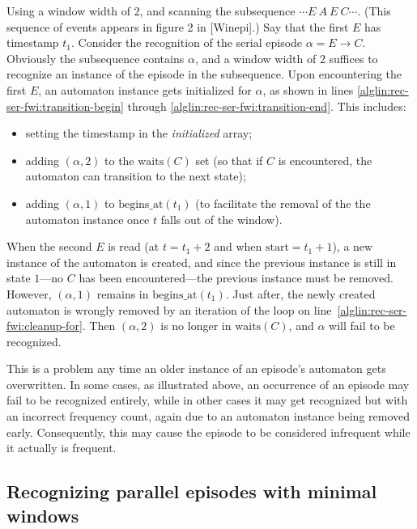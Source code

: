 Using a window width of 2, and scanning the subsequence $ \cdots E \: A \: E \: C \cdots $. (This sequence of events appears in figure 2 in [Winepi].) Say that the first $ E $ has timestamp $ t_1 $. Consider the recognition of the serial episode $ \alpha = E \to C $. Obviously the subsequence contains $ \alpha $, and a window width of 2 suffices to recognize an instance of the episode in the subsequence. Upon encountering the first $ E $, an automaton instance gets initialized for $ \alpha $, as shown in lines \ref{alglin:rec-ser-fwi:transition-begin} through \ref{alglin:rec-ser-fwi:transition-end}. This includes:
\begin{itemize}
\item setting the timestamp in the \emph{initialized} array;
\item adding $ (\alpha, 2) $ to the $ \text{waits}(C) $ set (so that if $ C $ is encountered, the automaton can transition to the next state);
\item adding $ (\alpha, 1) $ to $ \text{begins\_at}(t_1) $ (to facilitate the removal of the the automaton instance once $ t $ falls out of the window).
\end{itemize}

When the second $ E $ is read (at $ t = t_1 + 2 $ and when $ \text{start} = t_1 + 1 $), a new instance of the automaton is created, and since the previous instance is still in state $ 1 $---no $ C $ has been encountered---the previous instance must be removed. However, $ (\alpha, 1) $ remains in $ \text{begins\_at}(t_1) $. Just after, the newly created automaton is wrongly removed by an iteration of the loop on line~\ref{alglin:rec-ser-fwi:cleanup-for}. Then $ (\alpha, 2) $ is no longer in $ \text{waits}(C) $, and $ \alpha $ will fail to be recognized.

This is a problem any time an older instance of an episode's automaton gets overwritten. In some cases, as illustrated above, an occurrence of an episode may fail to be recognized entirely, while in other cases it may get recognized but with an incorrect frequency count, again due to an automaton instance being removed early. Consequently, this may cause the episode to be considered infrequent while it actually is frequent.

\subsection{Recognizing parallel episodes with minimal windows}

